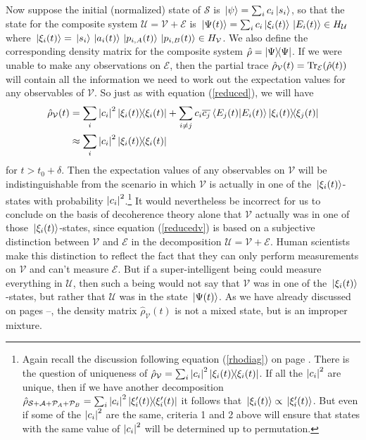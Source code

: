     Now suppose the initial (normalized) state of $\mathcal{S}$ is $\ket*{\psi}=\sum_i c_i\ket*{s_i}$, so that the state for the composite system $\mathcal{U}=\mathcal{V}+\mathcal{E}$ is $\ket*{\Psi(t)}=\sum_i c_i \ket*{\xi_i(t)}\ket*{E_i(t)}\in H_{\mathcal{U}}$ where $\ket*{\xi_i(t)}=\ket*{s_i}\ket*{a_i(t)}\ket*{p_{i,A}(t)}\ket*{p_{i,B}(t)}\in H_{\mathcal{V}}$. %
     We also define the corresponding density matrix for the composite system $\hat{\rho}=\dyad{\Psi}$. If we were unable to make any observations on $\mathcal{E}$, then 
     the partial trace
    $\hat{\rho}_{\mathcal{V}}(t)=\operatorname{Tr}_\mathcal{E}(\hat{\rho}(t))$ will contain all the information we need to work out the expectation values for any observables of  $\mathcal{V}.$ So just as with equation (\ref{reduced}), we will have
    \begin{equation} \label{reducedv}
    \begin{split}
      \hat{\rho}_{\mathcal{V}}(t)&=\sum_{i}\abs{c_i}^2\dyad{\xi_i(t)}+\sum_{i\neq j}c_i\overline{c_j}\ip{E_j(t)}{E_i(t)}\dyad{\xi_i(t)}{\xi_j(t)}\\
      &\approx \sum_{i}\abs{c_i}^2\dyad{\xi_i(t)}
      \end{split}\end{equation}
      for $t>t_0+\delta.$ Then the expectation values of any observables on $\mathcal{V}$ will be indistinguishable from the scenario in which $\mathcal{V}$ is actually in one of the $\ket*{\xi_i(t)}$-states with probability $\abs{c_i}^2$.\footnote{Again recall the discussion following equation (\ref{rhodiag}) on page \pageref{rhodiag}. There is the question of uniqueness of $\hat{\rho}_{\mathcal{V}}=\sum_{i}\abs{c_i}^2\dyad{\xi_i(t)}$. If all the $\abs{c_i}^2$ are unique, then if we have another decomposition $\hat{\rho}_{\mathcal{S}+\mathcal{A}+\mathcal{P}_A+\mathcal{P}_B}=\sum_{i}\abs{c_i}^2\dyad{\xi_i'(t)}$ it follows that $\ket*{\xi_i(t)}\propto\ket*{\xi_i'(t)}$. But even if some of the $\abs{c_i}^2$ are the same, criteria 1 and 2 above will ensure that states with the same  value of $\abs{c_i}^2$ will be determined up to permutation.} It would nevertheless be incorrect for us to conclude on the basis of decoherence theory alone that $\mathcal{V}$ actually was in one of those $\ket*{\xi_i(t)}$-states, since equation (\ref{reducedv}) is based on a subjective distinction between $\mathcal{V}$ and $\mathcal{E}$ in the decomposition $\mathcal{U}=\mathcal{V}+\mathcal{E}.$ Human scientists make this distinction to reflect the fact that they can only perform measurements on $\mathcal{V}$ and can't measure $\mathcal{E}$. But if a super-intelligent being could measure everything in  $\mathcal{U}$, then such a being would not say that $\mathcal{V}$ was in one of the  $\ket*{\xi_i(t)}$-states, but rather that $\mathcal{U}$ was in the state $\ket*{\Psi(t)}$. As we have already discussed on pages \pageref{subtle}--\pageref{subtleend}, the density matrix $ \hat{\rho}_{\mathcal{V}}(t)$ is not a mixed state, but is an improper mixture. 
    
